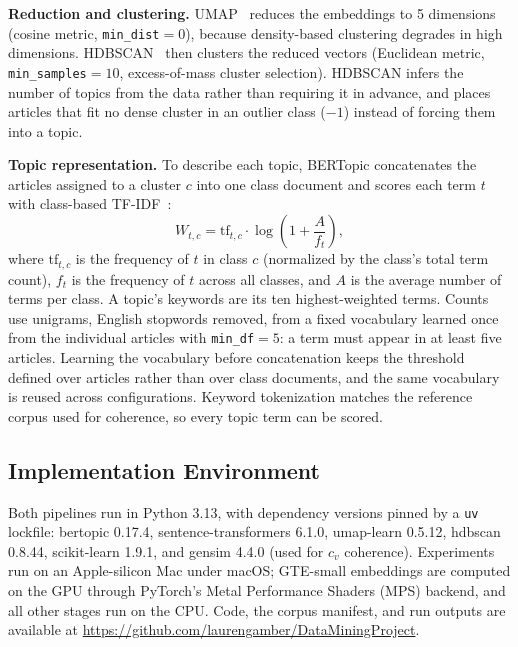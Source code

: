 \documentclass[conference]{IEEEtran}
\begin{document}
\textbf{Reduction and clustering.} UMAP~\cite{mcinnes2018umap} reduces the embeddings to 5 dimensions (cosine metric, \texttt{min\_dist}$=0$), because density-based clustering degrades in high dimensions. HDBSCAN~\cite{campello2013hdbscan} then clusters the reduced vectors (Euclidean metric, \texttt{min\_samples}$=10$, excess-of-mass cluster selection). HDBSCAN infers the number of topics from the data rather than requiring it in advance, and places articles that fit no dense cluster in an outlier class ($-1$) instead of forcing them into a topic.

\textbf{Topic representation.} To describe each topic, BERTopic concatenates the articles assigned to a cluster $c$ into one class document and scores each term $t$ with class-based TF-IDF~\cite{grootendorst2022bertopic}:
\begin{equation}
W_{t,c} = \mathrm{tf}_{t,c}\cdot\log\!\left(1+\frac{A}{f_t}\right),
\label{eq:ctfidf}
\end{equation}
where $\mathrm{tf}_{t,c}$ is the frequency of $t$ in class $c$ (normalized by the class's total term count), $f_t$ is the frequency of $t$ across all classes, and $A$ is the average number of terms per class. A topic's keywords are its ten highest-weighted terms. Counts use unigrams, English stopwords removed, from a fixed vocabulary learned once from the individual articles with \texttt{min\_df}$=5$: a term must appear in at least five articles. Learning the vocabulary before concatenation keeps the threshold defined over articles rather than over class documents, and the same vocabulary is reused across configurations. Keyword tokenization matches the reference corpus used for coherence, so every topic term can be scored.

\subsection*{Implementation Environment}
Both pipelines run in Python 3.13, with dependency versions pinned by a \texttt{uv} lockfile: bertopic 0.17.4, sentence-transformers 6.1.0, umap-learn 0.5.12, hdbscan 0.8.44, scikit-learn 1.9.1, and gensim 4.4.0 (used for $c_v$ coherence). Experiments run on an Apple-silicon Mac under macOS; GTE-small embeddings are computed on the GPU through PyTorch's Metal Performance Shaders (MPS) backend, and all other stages run on the CPU. Code, the corpus manifest, and run outputs are available at \url{https://github.com/laurengamber/DataMiningProject}.
\end{document}
